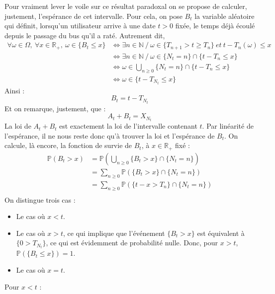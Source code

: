 \documentclass[a4paper, titlepage]{livret} %
\begin{document}
			Pour vraiment lever le voile sur ce résultat paradoxal on se propose de calculer, justement, l'espérance de cet intervalle.
			Pour cela, on pose $B_{t}$ la variable aléatoire qui définit, lorsqu'un utilisateur arrive à une date $t > 0$ fixée, le temps déjà écoulé depuis le passage du bus qu'il a raté.
			Autrement dit,
			\[\begin{aligned}
				\forall \omega \in \Omega,\  \forall x \in \mathbb{R}_{+}, \ \omega \in \{B_{t} \leq x\} & \Leftrightarrow \exists n \in \mathbb{N}\ / \ \omega \in \{T_{n+1} >  t \geq T_{n}\} \ et \ t - T_{n}(\omega) \leq x\\
																										 & \Leftrightarrow \exists n \in \mathbb{N}\ / \ \omega \in \{N_{t} = n\} \cap \{t - T_{n} \leq x\}\\
																										 & \Leftrightarrow \omega \in \bigcup_{n \geq 0} \{N_{t} = n\} \cap \{t - T_{n} \leq x\}\\
																										 & \Leftrightarrow \omega \in \{t - T_{N_{t}} \leq x\}
			\end{aligned}\]
			Ainsi :
			\[\boxed{
				B_{t} = t - T_{N_{t}}
			}\]
			Et on remarque, justement, que :
			\[\boxed{
				A_{t} + B_{t} = X_{N_{t}}
			}\]
			La loi de $A_{t} + B_{t}$ est exactement la loi de l'intervalle contenant $t$.
			Par linéarité de l'espérance, il ne nous reste donc qu'à trouver la loi et l'espérance de $B_{t}$.
			On calcule, là encore, la fonction de survie de $B_{t}$, à $x \in \mathbb{R}_{+}$ fixé :
			\[\begin{aligned}
				\mathbb{P}(B_{t} > x) & = \mathbb{P}\left(\bigcup_{n \geq 0} \{B_{t} > x\} \cap \{N_{t} = n\}\right)\\
									  & = \sum_{n \geq 0} \mathbb{P}(\{B_{t} > x\} \cap \{N_{t} = n\})\\
									  & = \sum_{n \geq 0} \mathbb{P}(\{t - x > T_{n}\} \cap \{N_{t} = n\})\\
			\end{aligned}\]
			On distingue trois cas :
			\begin{itemize}
				\item Le cas où $x < t$.
				\item Le cas où $x > t$, ce qui implique que l'événement $\{B_{t} > x\}$ est équivalent à $\{0 > T_{N_{t}}\}$, ce qui est évidemment de probabilité nulle. Donc, pour $x > t$, $\mathbb{P}(\{B_{t} \leq x\}) = 1$.
				\item Le cas où $x = t$.
			\end{itemize}
			Pour $x < t$ :
\end{document}
